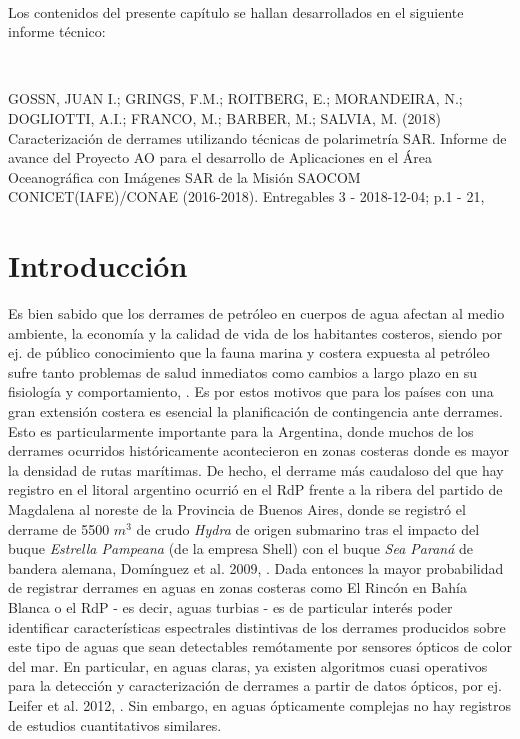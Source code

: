 $\quad$

\noindent
Los contenidos del presente capítulo se hallan desarrollados en el siguiente informe técnico:

$\quad$

\noindent
GOSSN, JUAN I.; GRINGS, F.M.; ROITBERG, E.; MORANDEIRA, N.; DOGLIOTTI, A.I.; FRANCO, M.; BARBER, M.; SALVIA, M. (2018) Caracterización de derrames utilizando técnicas de polarimetría SAR. Informe de avance del Proyecto AO para el desarrollo de Aplicaciones en el Área Oceanográfica con Imágenes SAR de la Misión SAOCOM CONICET(IAFE)/CONAE (2016-2018). Entregables 3 - 2018-12-04; p.1 - 21, \cite{gossn2018a}

\section{Introducción}
\label{oil:s:intro}

    Es bien sabido que los derrames de petróleo en cuerpos de agua afectan al medio ambiente, la economía y la calidad de vida de los habitantes costeros, siendo por ej. de público conocimiento que la fauna marina y costera expuesta al petróleo sufre tanto problemas de salud inmediatos como cambios a largo plazo en su fisiología y comportamiento, \cite{alonso2007}\cite{bendavid2000}\cite{ridoux2004}.
    Es por estos motivos que para los países con una gran extensión costera es esencial la planificación de contingencia ante derrames. Esto es particularmente importante para la Argentina, donde muchos de los derrames ocurridos históricamente acontecieron en zonas costeras donde es mayor la densidad de rutas marítimas. De hecho, el derrame más caudaloso del que hay registro en el litoral argentino ocurrió en el RdP frente a la ribera del partido de Magdalena al noreste de la Provincia de Buenos Aires, donde se registró el derrame de 5500 $m^{3}$ de crudo \textit{Hydra} de origen submarino tras el impacto del buque \textit{Estrella Pampeana} (de la empresa Shell) con el buque \textit{Sea Paraná} de bandera alemana, Domínguez et al. 2009, \cite{dominguez2009}.
    Dada entonces la mayor probabilidad de registrar derrames en aguas en zonas costeras como El Rincón en Bahía Blanca o el RdP - es decir, aguas turbias - es de particular interés poder identificar características espectrales distintivas de los derrames producidos sobre este tipo de aguas que sean detectables remótamente por sensores ópticos de color del mar. En particular,  en aguas claras, ya existen algoritmos cuasi operativos para la detección y caracterización de derrames a partir de datos ópticos, por ej. Leifer et al. 2012, \cite{leifer2012}. Sin embargo, en aguas ópticamente complejas no hay registros de estudios cuantitativos similares.

